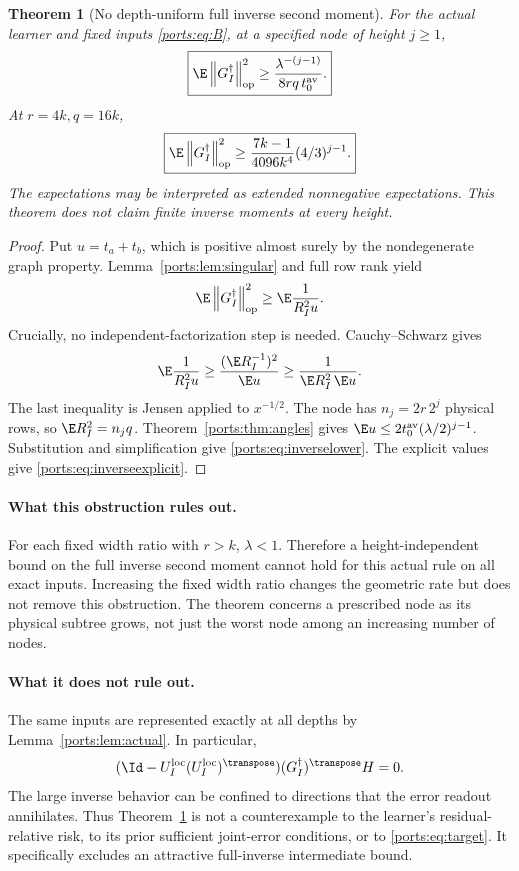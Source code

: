\documentclass[11pt,oneside,openany,a4paper]{book}
\numberwithin{equation}{chapter}
\newtheorem{theorem}{Theorem}[chapter]
\theoremstyle{definition}
\theoremstyle{remark}
\newcommand{\op}[1]{\left\lVert#1\right\rVert_{\rm op}}
\begin{document}
\begin{theorem}[No depth-uniform full inverse second moment]\label{ports:thm:inverse}
For the actual learner and fixed inputs \eqref{ports:eq:B}, at a specified node of height $j\ge1$,
\begin{equation}\label{ports:eq:inverselower}
 \boxed{\E\op{G_I^\dagger}^2
 \ge\frac{\lambda^{-(j-1)}}{8rq\,t_0^{\rm av}}.}
\end{equation}
At $r=4k,q=16k$,
\begin{equation}\label{ports:eq:inverseexplicit}
 \boxed{\E\op{G_I^\dagger}^2
 \ge\frac{7k-1}{4096k^4}(4/3)^{j-1}.}
\end{equation}
The expectations may be interpreted as extended nonnegative expectations. This theorem does not claim finite inverse moments at every height.
\end{theorem}
\begin{proof}
Put $u=t_a+t_b$, which is positive almost surely by the nondegenerate graph property. Lemma~\ref{ports:lem:singular} and full row rank yield
\[
 \E\op{G_I^\dagger}^2\ge\E\frac1{R_I^2u}.
\]
Crucially, no independent-factorization step is needed. Cauchy--Schwarz gives
\[
 \E\frac1{R_I^2u}\ge
 \frac{(\E R_I^{-1})^2}{\E u}
 \ge\frac1{\E R_I^2\,\E u}.
\]
The last inequality is Jensen applied to $x^{-1/2}$. The node has $n_j=2r\,2^j$ physical rows, so $\E R_I^2=n_jq$. Theorem~\ref{ports:thm:angles} gives
$\E u\le2t_0^{\rm av}(\lambda/2)^{j-1}$.
Substitution and simplification give \eqref{ports:eq:inverselower}. The explicit values give \eqref{ports:eq:inverseexplicit}.
\end{proof}

\paragraph{What this obstruction rules out.}
For each fixed width ratio with $r>k$, $\lambda<1$. Therefore a height-independent bound on the full inverse second moment cannot hold for this actual rule on all exact inputs. Increasing the fixed width ratio changes the geometric rate but does not remove this obstruction. The theorem concerns a prescribed node as its physical subtree grows, not just the worst node among an increasing number of nodes.

\paragraph{What it does not rule out.}
The same inputs are represented exactly at all depths by Lemma~\ref{ports:lem:actual}. In particular,
\begin{equation}\label{ports:eq:portkilled}
 (\Id-U_I^{\rm loc}(U_I^{\rm loc})^\transpose)
 (G_I^\dagger)^\transpose H=0.
\end{equation}
The large inverse behavior can be confined to directions that the error readout annihilates. Thus Theorem~\ref{ports:thm:inverse} is not a counterexample to the learner's residual-relative risk, to its prior sufficient joint-error conditions, or to \eqref{ports:eq:target}. It specifically excludes an attractive full-inverse intermediate bound.
\end{document}
